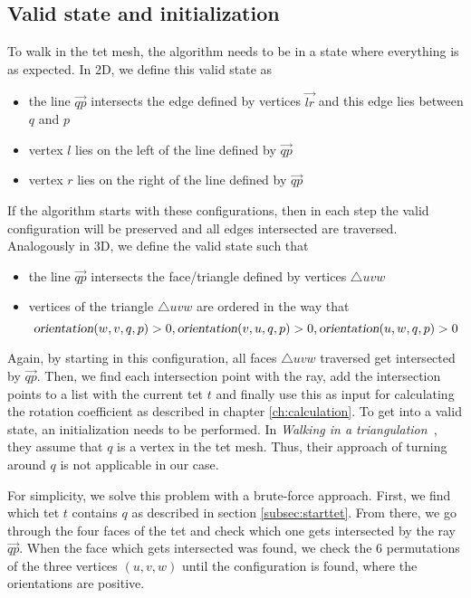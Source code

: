 \documentclass[../thesis.tex]{subfiles}
\begin{document}
\subsection{Valid state and initialization}\label{subsec:validstate}
To walk in the tet mesh, the algorithm needs to be in a state where everything is as expected.
In 2D, we define this valid state as
\begin{itemize}
  \item the line $\Vec{qp}$ intersects the edge defined by vertices $\Vec{lr}$ and this edge lies between $q$ and $p$
  \item vertex $l$ lies on the left of the line defined by $\Vec{qp}$
  \item vertex $r$ lies on the right of the line defined by $\Vec{qp}$
\end{itemize}
If the algorithm starts with these configurations, then in each step
the valid configuration will be preserved and all edges intersected are
traversed. 
Analogously in 3D, we define the valid state such that
\begin{itemize}
  \item the line $\Vec{qp}$ intersects the face/triangle defined by vertices $\triangle uvw$
  \item vertices of the triangle $\triangle uvw$ are ordered in the way that
  $$\textsl{orientation}(w,v,q,p)>0, \textsl{orientation}(v,u,q,p)>0, \textsl{orientation}(u,w,q,p)>0$$
\end{itemize}
Again, by starting in this configuration, all faces $\triangle uvw$
traversed get intersected by $\Vec{qp}$. Then, we find each
intersection point with the ray, add the intersection points to a list
with the current tet $t$ and finally use this as input for
calculating the rotation coefficient as described in chapter \ref{ch:calculation}.
To get into a valid state, an initialization needs to be performed.
In \emph{Walking in a triangulation}~\cite{Devillers}, they assume that
$q$ is a vertex in the tet mesh. Thus, their approach of turning around $q$
is not applicable in our case.

For simplicity, we solve this problem with a brute-force approach.
First, we find which tet $t$ contains $q$ as described in section \ref{subsec:starttet}.
From there, we go through the four faces of the tet and check which
one gets intersected by the ray $\Vec{qp}$.
When the face which gets intersected was found,
we check the 6 permutations of the three vertices $(u,v,w)$
until the configuration is found, where the orientations are positive.
\end{document}

